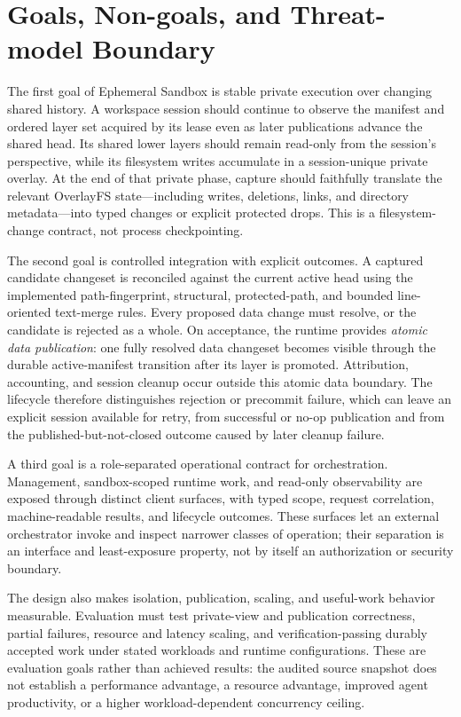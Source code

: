 \section{Goals, Non-goals, and Threat-model Boundary}
\label{sec:goals-nongoals}

The first goal of Ephemeral Sandbox is stable private execution over changing
shared history.  A workspace session should continue to observe the manifest
and ordered layer set acquired by its lease even as later publications advance
the shared head.  Its shared lower layers should remain read-only from the
session's perspective, while its filesystem writes accumulate in a
session-unique private overlay.  At the end of that private phase, capture
should faithfully translate the relevant OverlayFS state---including writes,
deletions, links, and directory metadata---into typed changes or explicit
protected drops.  This is a filesystem-change contract, not process
checkpointing.

The second goal is controlled integration with explicit outcomes.  A captured
candidate changeset is reconciled against the current active head using the
implemented path-fingerprint, structural, protected-path, and bounded
line-oriented text-merge rules.  Every proposed data change must resolve, or
the candidate is rejected as a whole.  On acceptance, the runtime provides
\emph{atomic data publication}: one fully resolved data changeset becomes
visible through the durable active-manifest transition after its layer is
promoted.  Attribution, accounting, and session cleanup occur outside this
atomic data boundary.  The lifecycle therefore distinguishes rejection or
precommit failure, which can leave an explicit session available for retry,
from successful or no-op publication and from the
published-but-not-closed outcome caused by later cleanup failure.

A third goal is a role-separated operational contract for orchestration.
Management, sandbox-scoped runtime work, and read-only observability are
exposed through distinct client surfaces, with typed scope, request
correlation, machine-readable results, and lifecycle outcomes.  These surfaces
let an external orchestrator invoke and inspect narrower classes of operation;
their separation is an interface and least-exposure property, not by itself an
authorization or security boundary.

The design also makes isolation, publication, scaling, and useful-work behavior
measurable.  Evaluation must test private-view and publication correctness,
partial failures, resource and latency scaling, and verification-passing
durably accepted work under stated workloads and runtime configurations.
These are evaluation goals rather than achieved results: the audited source snapshot
does not establish a performance advantage, a resource advantage, improved
agent productivity, or a higher workload-dependent concurrency ceiling.

